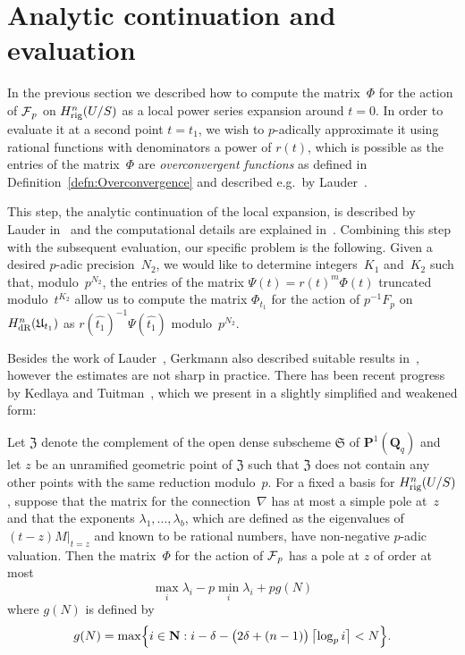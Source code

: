\section{Analytic continuation and evaluation}
\label{sec:01-dm-06-continuation}

In the previous section we described how to compute the matrix~$\Phi$ 
for the action of $\operatorname{\mathcal{F}}_p$ on $H_{\text{rig}}^{n}(U/S)$ 
as a local power series expansion around $t = 0$.  In order to evaluate it 
at a second point $t = t_1$, we wish to $p$-adically approximate it 
using rational functions with denominators a power of $r(t)$, which 
is possible as the entries of the matrix~$\Phi$ are \emph{overconvergent 
functions} as defined in Definition~\ref{defn:Overconvergence} and 
described e.g.\ by Lauder~\citep[\S 3.5]{Lauder2006}.

This step, the analytic continuation of the local expansion, is described 
by Lauder in~\citep[\S 5.2]{Lauder2006} and the computational details are 
explained in~\citep[\S 8.1]{Lau04a}.  Combining this step with the subsequent 
evaluation, our specific problem is the following.  Given a desired $p$-adic 
precision~$N_2$, we would like to determine integers~$K_1$ and~$K_2$ such 
that, modulo~$p^{N_2}$, the entries of the matrix $\Psi(t) = r(t)^m \Phi(t)$ 
truncated modulo~$t^{K_2}$ allow us to compute the matrix $\Phi_{t_1}$ for 
the action of $p^{-1} F_p$ on $H_{\text{dR}}^{n}(\mathfrak{U}_{t_1})$ as 
$r(\hat{t_1})^{-1} \Psi(\hat{t_1})$ modulo~$p^{N_2}$.

Besides the work of Lauder~\citep[\S 8.1]{Lau04a}, Gerkmann also described 
suitable results in~\citep[\S 6]{Gerkmann2007}, however the estimates are 
not sharp in practice.  There has been recent progress by Kedlaya and 
Tuitman~\citep[Theorem~2.1]{KedlayaTuitman2012}, which we present in a 
slightly simplified and weakened form:

\begin{thm} \label{thm:KedlayaTuitman}
Let $\mathfrak{Z}$ denote the complement of the open dense 
subscheme $\mathfrak{S}$ of $\mathbf{P}^{1}(\mathbf{Q}_q)$ 
and let $z$ be an unramified geometric point of $\mathfrak{Z}$ 
such that $\mathfrak{Z}$ does not contain any other points 
with the same reduction modulo~$p$.  For a fixed a basis for 
$H_{\text{rig}}^n(U/S)$, suppose that the matrix 
for the connection~$\nabla$ has at most a simple pole at~$z$ 
and that the exponents $\lambda_1, \dotsc, \lambda_{b}$, 
which are defined as the eigenvalues of $(t - z) M \vert_{t=z}$ 
and known to be rational numbers, have non-negative $p$-adic 
valuation.  Then the matrix~$\Phi$ for the action of $\operatorname{\mathcal{F}}_p$ 
has a pole at $z$ of order at most 
\begin{equation} \label{eq:KedlayaTuitman}
\max_{i} \lambda_i - p \min_{i} \lambda_i + p g(N)
\end{equation}
where $g(N)$ is defined by 
\begin{equation}
g(N) = \max\Bigl\{ i \in \mathbf{N} : i - \delta - \bigl(2\delta + (n-1)\bigr) \left\lceil\log_p i\right\rceil < N \Bigr\}.
\end{equation}
\end{thm}

